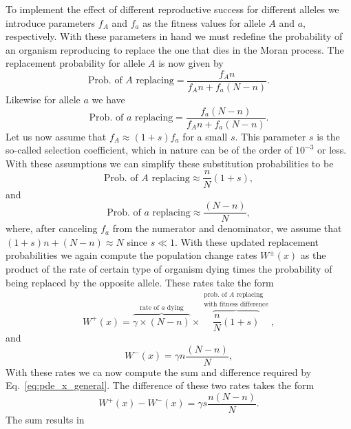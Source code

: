 To implement the effect of different reproductive success for different alleles
we introduce parameters $f_A$ and $f_a$ as the fitness values for allele $A$ and
$a$, respectively. With these parameters in hand we must redefine the
probability of an organism reproducing to replace the one that dies in the Moran
process. The replacement probability for allele $A$ is now given by
\begin{equation}
    \text{Prob. of $A$ replacing} = \frac{f_A n}{f_A n + f_a (N - n)}.
\end{equation}
Likewise for allele $a$ we have
\begin{equation}
    \text{Prob. of $a$ replacing} = \frac{f_a (N - n)}{f_A n + f_a (N - n)}.
\end{equation}
Let us now assume that $f_A \approx (1 + s) f_a$ for a small $s$. This parameter
$s$ is the so-called selection coefficient, which in nature can be of the order
of $10^{-3}$ or less. With these assumptions we can simplify these substitution
probabilities to be
\begin{equation}
    \text{Prob. of $A$ replacing} \approx \frac{n}{N}(1 + s),
\end{equation}
and
\begin{equation}
    \text{Prob. of $a$ replacing} \approx \frac{(N - n)}{N},
\end{equation}
where, after canceling $f_a$ from the numerator and denominator, we assume that
$(1 + s)n + (N - n) \approx N$ since $s \ll 1$. With these updated replacement
probabilities we again compute the population change rates $W^\pm(x)$ as the
product of the rate of certain type of organism dying times the probability of
being replaced by the opposite allele. These rates take the form
\begin{equation}
    W^+(x) = 
    \overbrace{\gamma \times (N - n)}^{\text{rate of $a$ dying}} \times
    \overbrace{\frac{n}{N} (1 + s)}^
    {\substack{\text{prob. of $A$ replacing}\\ \text{with fitness difference}}},
\end{equation}
and
\begin{equation}
    W^-(x) = \gamma n \frac{(N - n)}{N},
\end{equation}
With these rates we ca now compute the sum and difference required by
Eq.~\ref{eq:pde_x_general}. The difference of these two rates takes the form
\begin{equation}
    W^+(x) - W^-(x) = \gamma s \frac{n(N-n)}{N}.
\end{equation}
The sum results in
